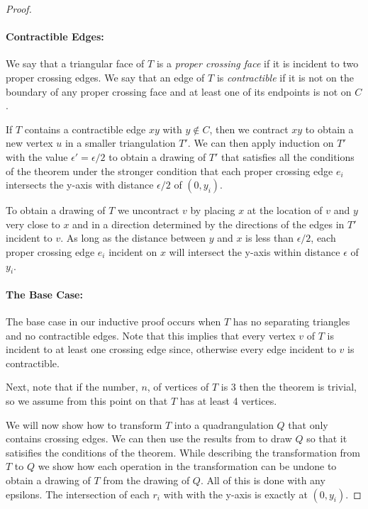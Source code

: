 \documentclass{patmorin}
\begin{document}
\begin{proof}
   \paragraph{Contractible Edges:}
   We say that a triangular face of $T$ is a \emph{proper crossing face}
   if it is incident to two proper crossing edges.  We say that an edge
   of $T$ is \emph{contractible} if it is not on the boundary of any
   proper crossing face and at least one of its endpoints is not on $C$.

   If $T$ contains a contractible edge $xy$ with $y\not\in C$,
   then we contract $xy$ to obtain a new vertex $u$ in a smaller
   triangulation $T'$.   We can then apply induction on $T'$ with the
   value $\epsilon'=\epsilon/2$ to obtain a drawing of $T'$ that satisfies
   all the conditions of the theorem under the stronger condition that
   each proper crossing edge $e_i$ intersects the y-axis with distance
   $\epsilon/2$ of $(0,y_i)$.

   To obtain a drawing of $T$ we uncontract $v$ by placing $x$ at
   the location of $v$ and $y$ very close to $x$ and in a direction
   determined by the directions of the edges in $T'$ incident to $v$.
   As long as the distance between $y$ and $x$ is less than $\epsilon/2$,
   each proper crossing edge $e_i$ incident on $x$ will intersect the
   y-axis within distance $\epsilon$ of $y_i$.

   \paragraph{The Base Case:}
   The base case in our inductive proof occurs when $T$ has no separating
   triangles and no contractible edges.  Note that this implies that
   every vertex $v$ of $T$ is incident to at least one crossing edge
   since, otherwise every edge incident to $v$ is contractible.
  
   Next,  note that if the number, $n$, of vertices of $T$ is 3 then
   the theorem is trivial, so we assume from this point on that $T$
   has at least 4 vertices.

   We will now show how to transform $T$ into a quadrangulation $Q$
   that only contains crossing edges.  We can then use the results from
    to draw $Q$ so that it satisifies the conditions of
   the theorem.  While describing the transformation from $T$ to $Q$ we
   show how each operation in the transformation can be undone to obtain
   a drawing of $T$ from the drawing of $Q$.  All of this is done with
   any epsilons. The intersection of each $r_i$ with with the y-axis is
   exactly at $(0,y_i)$.


\end{proof}
\end{document}
